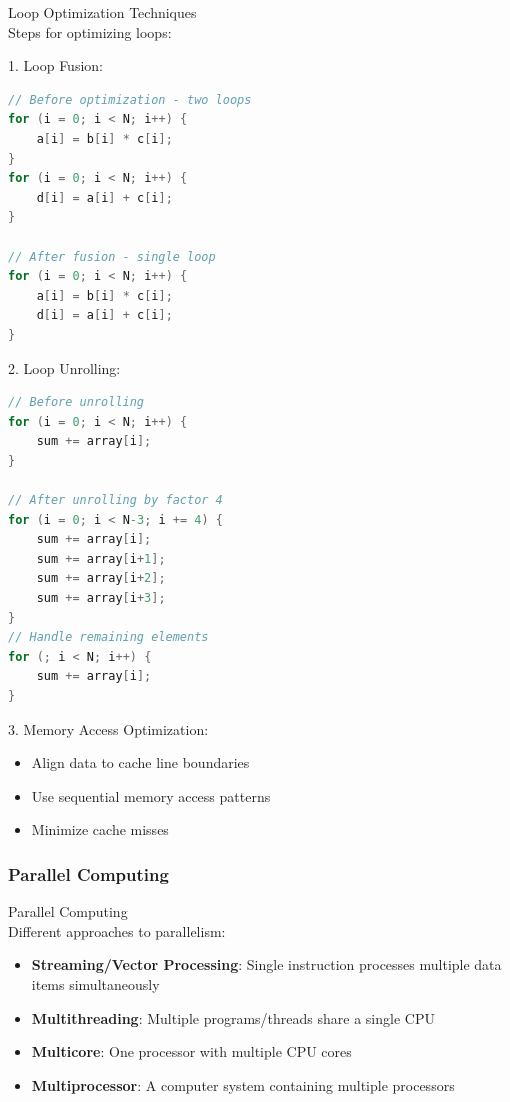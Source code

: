 \begin{KR}{Loop Optimization Techniques}\\
Steps for optimizing loops:

1. Loop Fusion:
\begin{lstlisting}[language=C, style=basesmol]
// Before optimization - two loops
for (i = 0; i < N; i++) {
    a[i] = b[i] * c[i];
}
for (i = 0; i < N; i++) {
    d[i] = a[i] + c[i];
}

// After fusion - single loop
for (i = 0; i < N; i++) {
    a[i] = b[i] * c[i];
    d[i] = a[i] + c[i];
}
\end{lstlisting}

2. Loop Unrolling:
\begin{lstlisting}[language=C, style=basesmol]
// Before unrolling
for (i = 0; i < N; i++) {
    sum += array[i];
}

// After unrolling by factor 4
for (i = 0; i < N-3; i += 4) {
    sum += array[i];
    sum += array[i+1];
    sum += array[i+2];
    sum += array[i+3];
}
// Handle remaining elements
for (; i < N; i++) {
    sum += array[i];
}
\end{lstlisting}

3. Memory Access Optimization:
\begin{itemize}
  \item Align data to cache line boundaries
  \item Use sequential memory access patterns
  \item Minimize cache misses
\end{itemize}
\end{KR}



\columnbreak

\subsubsection{Parallel Computing}

\begin{concept}{Parallel Computing}\\
Different approaches to parallelism:
\begin{itemize}
  \item \textbf{Streaming/Vector Processing}: Single instruction processes multiple data items simultaneously
  \item \textbf{Multithreading}: Multiple programs/threads share a single CPU
  \item \textbf{Multicore}: One processor with multiple CPU cores
  \item \textbf{Multiprocessor}: A computer system containing multiple processors
\end{itemize}
\end{concept}


